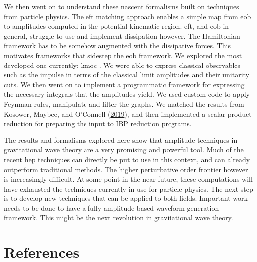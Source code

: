 \documentclass[
  11pt,
  a4paper,
  DIV=11,
  numbers=noendperiod,
  oneside]{scrreprt}
\DeclareRobustCommand{\[}{\begin{equation}}
\DeclareRobustCommand{\]}{\end{equation}}
\begin{document}
We then went on to understand these nascent formalisms built on
techniques from particle physics. The \gls{eft} matching approach
enables a simple map from \gls{eob} to amplitudes computed in the
potential kinematic region. \gls{eft}, and \gls{eob} in general,
struggle to use and implement dissipation however. The Hamiltonian
framework has to be somehow augmented with the dissipative forces. This
motivates frameworks that sidestep the \gls{eob} framework. We explored
the most developed one currently: \gls{kmoc} . We were able to express
classical observables such as the impulse in terms of the classical
limit amplitudes and their unitarity cuts. We then went on to implement
a programmatic framework for expressing the necessary integrals that the
amplitudes yield. We used custom code to apply Feynman rules, manipulate
and filter the graphs. We matched the results from Kosower, Maybee, and
O'Connell (\protect\hyperlink{ref-Kosower:2018adc}{2019}), and then
implemented a scalar product reduction for preparing the input to IBP
reduction programs.

The results and formalisms explored here show that amplitude techniques
in gravitational wave theory are a very promising and powerful tool.
Much of the recent \gls{hep} techniques can directly be put to use in
this context, and can already outperform traditional methods. The higher
perturbative order frontier however is increasingly difficult. At some
point in the near future, these computations will have exhausted the
techniques currently in use for particle physics. The next step is to
develop new techniques that can be applied to both fields. Important
work needs to be done to have a fully amplitude based
waveform-generation framework. This might be the next revolution in
gravitational wave theory.


\hypertarget{references}{%
\chapter*{References}\label{references}}
\end{document}
